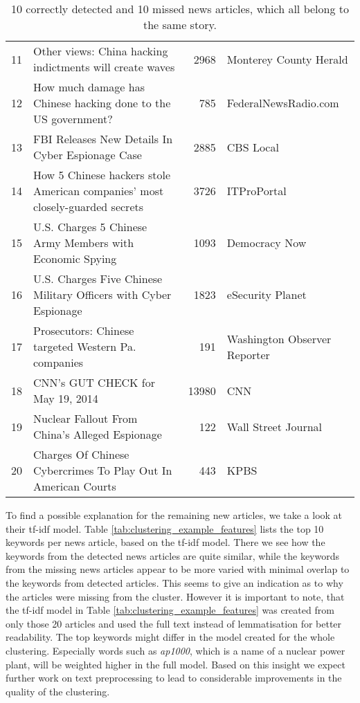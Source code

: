 \begin{table}[h]
{\begin{tabular}{rlrl}
            \hline
                11 & Other views: China hacking indictments will create waves                     &          2968 & Monterey County Herald       \\
                12 & How much damage has Chinese hacking done to the US government?               &           785 & FederalNewsRadio.com         \\
                13 & FBI Releases New Details In Cyber Espionage Case                             &          2885 & CBS Local                    \\
                14 & How 5 Chinese hackers stole American companies' most closely-guarded secrets &          3726 & ITProPortal                  \\
                15 & U.S. Charges 5 Chinese Army Members with Economic Spying                     &          1093 & Democracy Now                \\
                16 & U.S. Charges Five Chinese Military Officers with Cyber Espionage             &          1823 & eSecurity Planet             \\
                17 & Prosecutors: Chinese targeted Western Pa. companies                          &           191 & Washington Observer Reporter \\
                18 & CNN's GUT CHECK for May 19, 2014                                             &         13980 & CNN                  \\
                19 & Nuclear Fallout From China's Alleged Espionage                               &           122 & Wall Street Journal \\
                20 & Charges Of Chinese Cybercrimes To Play Out In American Courts                &           443 & KPBS               \\
                \hline
        \end{tabular}
    }
    \caption{10 correctly detected and 10 missed news articles, which all belong to the same story.}
    \label{tab:clustering_example}
\end{table}

To find a possible explanation for the remaining new articles, we take a look at their tf-idf model. Table \ref{tab:clustering_example_features} lists the top 10 keywords per news article, based on the tf-idf model. There we see how the keywords from the detected news articles are quite similar, while the keywords from the missing news articles appear to be more varied with minimal overlap to the keywords from detected articles. This seems to give an indication as to why the articles were missing from the cluster. However it is important to note, that the tf-idf model in Table \ref{tab:clustering_example_features} was created from only those 20 articles and used the full text instead of lemmatisation for better readability. The top keywords might differ in the model created for the whole clustering. Especially words such as \textit{ap1000}, which is a name of a nuclear power plant, will be weighted higher in the full model. Based on this insight we expect further work on text preprocessing to lead to considerable improvements in the quality of the clustering.

